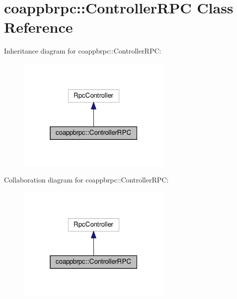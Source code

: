 \hypertarget{classcoappbrpc_1_1ControllerRPC}{}\section{coappbrpc\+:\+:Controller\+R\+PC Class Reference}
\label{classcoappbrpc_1_1ControllerRPC}


Inheritance diagram for coappbrpc\+:\+:Controller\+R\+PC\+:
\nopagebreak
\begin{figure}[H]
\begin{center}
\leavevmode
\includegraphics[width=211pt]{classcoappbrpc_1_1ControllerRPC__inherit__graph}
\end{center}
\end{figure}


Collaboration diagram for coappbrpc\+:\+:Controller\+R\+PC\+:
\nopagebreak
\begin{figure}[H]
\begin{center}
\leavevmode
\includegraphics[width=211pt]{classcoappbrpc_1_1ControllerRPC__coll__graph}
\end{center}
\end{figure}
